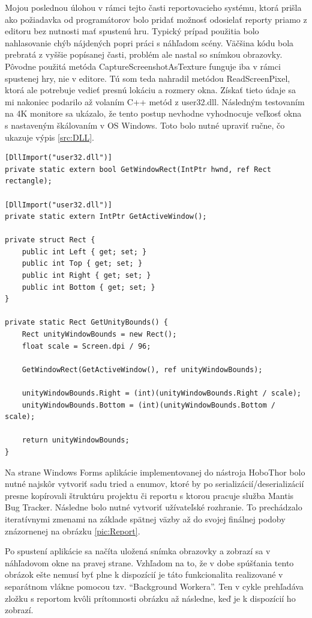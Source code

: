 \documentclass[slovak, bachelorpractice]{diploma}
\begin{document}
Mojou poslednou úlohou v rámci tejto časti reportovacieho systému, ktorá prišla ako požiadavka od programátorov bolo pridať možnosť odosielať reporty priamo z editoru bez nutnosti mať spustenú hru. Typický prípad použitia bolo nahlasovanie chýb nájdených popri práci s náhľadom scény. Väčšina  kódu bola prebratá z vyššie popísanej časti, problém ale nastal so snímkou obrazovky. Pôvodne použitá metóda CaptureScreenshotAsTexture funguje iba v rámci spustenej hry, nie v editore. Tú som teda nahradil metódou ReadScreenPixel, ktorá ale potrebuje vedieť presnú lokáciu a rozmery okna. Získať tieto údaje sa mi nakoniec podarilo až volaním C++ metód z user32.dll. Následným testovaním na 4K monitore sa ukázalo, že tento postup nevhodne vyhodnocuje veľkosť okna s nastaveným škálovaním v OS Windows. Toto bolo nutné upraviť ručne, čo ukazuje výpis \ref{src:DLL}.
\vspace{10pt}
\begin{lstlisting}[label=src:DLL,caption={Získanie veľkosti okna Unity editoru}]
[DllImport("user32.dll")]
private static extern bool GetWindowRect(IntPtr hwnd, ref Rect rectangle);

[DllImport("user32.dll")]
private static extern IntPtr GetActiveWindow();

private struct Rect {
    public int Left { get; set; }
    public int Top { get; set; }
    public int Right { get; set; }
    public int Bottom { get; set; }
}

private static Rect GetUnityBounds() {
    Rect unityWindowBounds = new Rect();
    float scale = Screen.dpi / 96;

    GetWindowRect(GetActiveWindow(), ref unityWindowBounds);

    unityWindowBounds.Right = (int)(unityWindowBounds.Right / scale);
    unityWindowBounds.Bottom = (int)(unityWindowBounds.Bottom / scale);

    return unityWindowBounds;
}
\end{lstlisting}

Na strane Windows Forms aplikácie implementovanej do nástroja HoboThor bolo nutné najskôr vytvoriť sadu tried a enumov, ktoré by po serializácií/deserializácií presne kopírovali štruktúru projektu či reportu s ktorou pracuje služba Mantis Bug Tracker. Následne bolo nutné vytvoriť užívateľské rozhranie. To prechádzalo iteratívnymi zmenami na základe spätnej väzby až do svojej finálnej podoby znázornenej na obrázku \ref{pic:Report}. 

Po spustení aplikácie sa načíta uložená snímka obrazovky a zobrazí sa v náhľadovom okne na pravej strane. Vzhľadom na to, že v dobe spúšťania tento obrázok ešte nemusí byť plne k dispozícií je táto funkcionalita realizované v separátnom vlákne pomocou tzv. \enquote{Background Workera}. Ten v cykle prehľadáva zložku s reportom kvôli prítomnosti obrázku až následne, keď je k dispozícií ho zobrazí.
\end{document}
